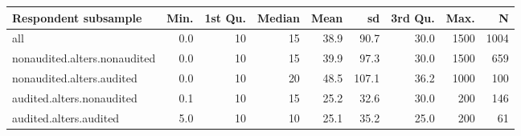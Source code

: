 \begin{table}[ht]
\centering
\begin{tabular}{lrrrrrrrr}
  \hline
Respondent subsample & Min. & 1st Qu. & Median & Mean & sd & 3rd Qu. & Max. & N \\ 
  \hline
all & 0.0 & 10 & 15 & 38.9 & 90.7 & 30.0 & 1500 & 1004 \\ 
  nonaudited.alters.nonaudited & 0.0 & 10 & 15 & 39.9 & 97.3 & 30.0 & 1500 & 659 \\ 
  nonaudited.alters.audited & 0.0 & 10 & 20 & 48.5 & 107.1 & 36.2 & 1000 & 100 \\ 
  audited.alters.nonaudited & 0.1 & 10 & 15 & 25.2 & 32.6 & 30.0 & 200 & 146 \\ 
  audited.alters.audited & 5.0 & 10 & 10 & 25.1 & 35.2 & 25.0 & 200 & 61 \\ 
   \hline
\end{tabular}
\end{table}
